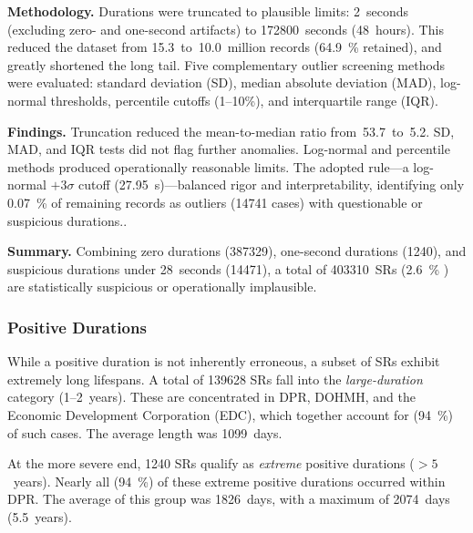 \documentclass[linenumber]{jdsart}
\newcommand{\numint}[1]{\num[round-mode=none]{#1}}
\begin{document}
\textbf{Methodology.}
Durations were truncated to plausible limits: 2~seconds (excluding
zero- and one-second artifacts) to \numint{172800}~seconds (48~hours). This reduced
the dataset from 15.3~to~10.0~million records (\SI[round-precision = 2]{64.9}{\percent}
retained), and greatly shortened the long tail. Five complementary outlier
screening methods were evaluated: standard deviation (SD), median absolute
deviation (MAD), log-normal thresholds, percentile cutoffs (1–10\%), and
interquartile range (IQR).

\textbf{Findings.}
Truncation reduced the mean-to-median ratio from~53.7~to~5.2. SD, 
MAD, and IQR tests did not flag further anomalies. Log-normal and 
percentile methods produced operationally reasonable limits. 
The adopted rule—a log-normal $+3\sigma$ cutoff (\SI{27.95}{\second})—balanced 
rigor and interpretability, identifying only \SI[round-precision = 2]{0.07}{\percent} 
of remaining records as outliers (\numint{14741} cases) with questionable or suspicious
durations..

\textbf{Summary.}
Combining zero durations (\numint{387329}), one-second durations (\numint{1240}), and
suspicious durations under 28~seconds (\numint{14471}), a total of \numint{403310}~SRs
(\SI{2.6}{\percent} ) are statistically suspicious or operationally implausible.

\subsubsection{Positive Durations}
\label{subsubsec:positivedurations}
While a positive duration is not inherently erroneous, a subset of SRs exhibit
extremely long lifespans. A total of \numint{139628} SRs fall into the
\emph{large-duration} category (1–2~years). These are concentrated in DPR,
DOHMH, and the Economic Development Corporation (\textsc{EDC}), which together
account for (\SI[round-precision=0]{94}{\percent}) of such cases. The average length was
\numint{1099}~days.

At the more severe end, \numint{1240} SRs qualify as \emph{extreme} positive
durations (\(>5\)~years). Nearly all (\SI[round-precision=0]{94}{\percent})  of these
extreme positive durations occurred within DPR. The average of this group
was \numint{1826}~days, with a maximum of \numint{2074}~days (5.5~years).
\end{document}
